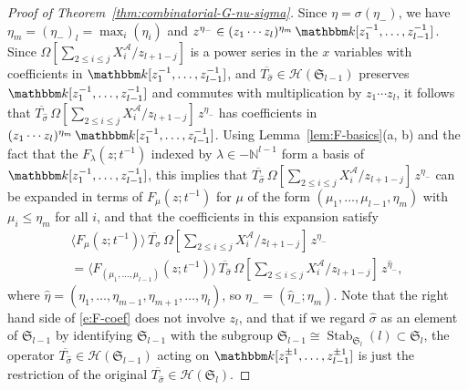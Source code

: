 \documentclass[12pt]{amsart}
\theoremstyle{definition}
\theoremstyle{remark}
\newcommand{\NN}{{\mathbb N}}
\newcommand{\kk}{{\mathbbm k}}
\newcommand{\Sfrak}{{\mathfrak S}}
\newcommand{\Acal}{{\mathcal A}}
\newcommand{\Hcal}{{\mathcal H}}
\newcommand{\sigmahat}{\widehat{\sigma }}
\newcommand{\etahat}{\widehat{\eta }}
\DeclareMathOperator{\Stab}{Stab}
\begin{document}
\begin{proof}[Proof of Theorem~\ref{thm:combinatorial-G-nu-sigma}]
Since $\eta = \sigma (\eta _{-})$, we have $\eta _{m} = (\eta
_{-})_{l} = \max _{i} (\eta _{i})$ and $z^{\eta _{-}}\in (z_{1}\cdots
z_{l})^{\eta _{m}}\, \kk [z_{1}^{-1},\ldots,z_{l-1}^{-1}]$.  Since
$\Omega [\sum _{2\leq i\leq j} X^\Acal_{i} /z_{l+1-j}]$ is a power
series in the $x$ variables with coefficients in $\kk
[z_{1}^{-1},\ldots,z_{l-1}^{-1}]$, and $\overline{T_{\sigmahat }} \in
\Hcal (\Sfrak _{l-1})$ preserves $\kk
[z_{1}^{-1},\ldots,z_{l-1}^{-1}]$ and commutes with multiplication by
$z_{1}\cdots z_{l}$, it follows that $\overline{T_{\sigmahat }}\,
\Omega [\sum _{2\leq i\leq j} X^\Acal_{i} /z_{l+1-j}]\, z^{\eta _{-}}$
has coefficients in $(z_{1}\cdots z_{l})^{\eta _{m}}\, \kk
[z_{1}^{-1},\ldots,z_{l-1}^{-1}]$.  Using Lemma~\ref{lem:F-basics}(a,
b) and the fact that the $F_\lambda (z;t^{-1})$ indexed by $\lambda
\in -\NN^{l-1}$ form a basis of $\kk
[z_{1}^{-1},\ldots,z_{l-1}^{-1}]$, this implies that
$\overline{T_{\sigmahat }}\, \Omega [\sum _{2\leq i\leq j} X^\Acal_{i}
/z_{l+1-j}]\, z^{\eta _{-}}$ can be expanded in terms of $F_{\mu
}(z;t^{-1})$ for $\mu $ of the form $(\mu _{1},\ldots,\mu _{l-1},\eta
_{m})$ with $\mu _{i}\leq \eta _{m}$ for all $i$, and that the
coefficients in this expansion satisfy
\begin{multline}\label{e:F-coef}
\langle F_{\mu }(z;t^{-1}) \rangle\, \overline{T_{\sigmahat }}\,
\Omega [\sum _{2\leq i\leq j} X^\Acal_{i} /z_{l+1-j}]\, z^{\eta _{-}}\\
 = \langle F_{(\mu _{1},\ldots,\mu _{l-1})}(z;t^{-1}) \rangle\,
\overline{T_{\sigmahat }}\, \Omega [\sum _{2\leq i\leq j} X^\Acal_{i}
/z_{l+1-j}]\, z^{\etahat _{-}},
\end{multline}
where $\etahat =(\eta _{1},\ldots,\eta _{m-1},\eta _{m+1},\ldots, \eta
_{l})$, so $\eta _{-} = (\etahat _{-}; \eta _{m})$.  Note that the
right hand side of \eqref{e:F-coef} does not involve $z_{l}$, and that
if we regard $\sigmahat $ as an element of $\Sfrak _{l-1}$ by
identifying $\Sfrak _{l-1}$ with the subgroup $\Sfrak _{l-1}\cong
\Stab _{\Sfrak _{l}}(l) \subset \Sfrak _{l}$, the operator
$\overline{T_{\sigmahat }}\in \Hcal (\Sfrak _{l-1})$ acting on $\kk
[z_{1}^{\pm 1},\ldots,z_{l-1}^{\pm 1}]$ is just the restriction of the
original $\overline{T_{\sigmahat }}\in \Hcal (\Sfrak _{l})$.


\end{proof}
\end{document}
